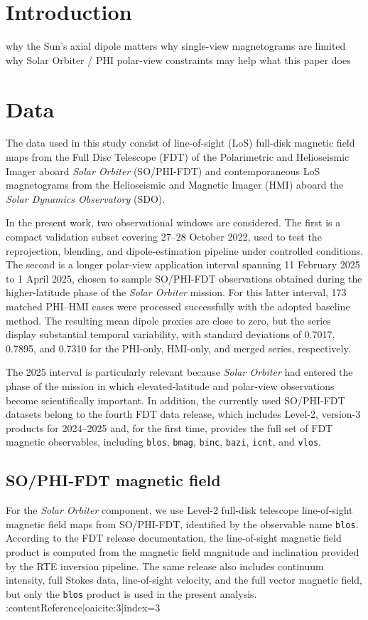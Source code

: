 \documentclass[namedreferences,hyperref,optionalrh]{spr-sola}
\begin{document}
\section{Introduction}
\label{sec:Introduction} 
why the Sun’s axial dipole matters
why single-view magnetograms are limited
why Solar Orbiter / PHI polar-view constraints may help
what this paper does
\section{Data}

The data used in this study consist of line-of-sight (LoS) full-disk magnetic field maps from the Full Disc Telescope (FDT) of the Polarimetric and Helioseismic Imager aboard \textit{Solar Orbiter} (SO/PHI-FDT) and contemporaneous LoS magnetograms from the Helioseismic and Magnetic Imager (HMI) aboard the \textit{Solar Dynamics Observatory} (SDO).

In the present work, two observational windows are considered. The first is a compact validation subset covering 27--28 October 2022, used to test the reprojection, blending, and dipole-estimation pipeline under controlled conditions. The second is a longer polar-view application interval spanning 11 February 2025 to 1 April 2025, chosen to sample SO/PHI-FDT observations obtained during the higher-latitude phase of the \textit{Solar Orbiter} mission. For this latter interval, 173 matched PHI--HMI cases were processed successfully with the adopted baseline method. The resulting mean dipole proxies are close to zero, but the series display substantial temporal variability, with standard deviations of 0.7017, 0.7895, and 0.7310 for the PHI-only, HMI-only, and merged series, respectively. 

The 2025 interval is particularly relevant because \textit{Solar Orbiter} had entered the phase of the mission in which elevated-latitude and polar-view observations become scientifically important. In addition, the currently used SO/PHI-FDT datasets belong to the fourth FDT data release, which includes Level-2, version-3 products for 2024--2025 and, for the first time, provides the full set of FDT magnetic observables, including \texttt{blos}, \texttt{bmag}, \texttt{binc}, \texttt{bazi}, \texttt{icnt}, and \texttt{vlos}. 
\subsection{SO/PHI-FDT magnetic field}

For the \textit{Solar Orbiter} component, we use Level-2 full-disk telescope line-of-sight magnetic field maps from SO/PHI-FDT, identified by the observable name \texttt{blos}. According to the FDT release documentation, the line-of-sight magnetic field product is computed from the magnetic field magnitude and inclination provided by the RTE inversion pipeline. The same release also includes continuum intensity, full Stokes data, line-of-sight velocity, and the full vector magnetic field, but only the \texttt{blos} product is used in the present analysis. :contentReference[oaicite:3]{index=3}
\end{document}
